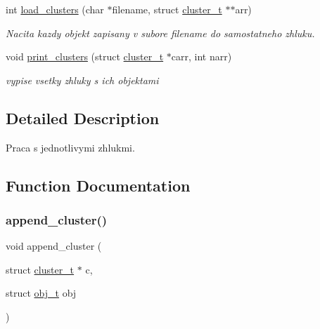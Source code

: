 \begin{DoxyCompactItemize}
int \hyperlink{group___praca_ga9d928923d43120cb53ddff210a087061}{load\+\_\+clusters} (char $\ast$filename, struct \hyperlink{structcluster__t}{cluster\+\_\+t} $\ast$$\ast$arr)
\begin{DoxyCompactList}\small\item\em Nacita kazdy objekt zapisany v subore filename do samostatneho zhluku. \end{DoxyCompactList}\item 
void \hyperlink{group___praca_gad350e6021e5fead00ff2eeec4d134525}{print\+\_\+clusters} (struct \hyperlink{structcluster__t}{cluster\+\_\+t} $\ast$carr, int narr)
\begin{DoxyCompactList}\small\item\em vypise vsetky zhluky s ich objektami \end{DoxyCompactList}\end{DoxyCompactItemize}


\subsection{Detailed Description}
Praca s jednotlivymi zhlukmi. 



\subsection{Function Documentation}
\hypertarget{group___praca_gab6269b64b2c7f4842a51c58b2d86a2e5}{}\label{group___praca_gab6269b64b2c7f4842a51c58b2d86a2e5} 
\subsubsection{\texorpdfstring{append\+\_\+cluster()}{append\_cluster()}}
{\footnotesize\ttfamily void append\+\_\+cluster (\begin{DoxyParamCaption}\item[{struct \hyperlink{structcluster__t}{cluster\+\_\+t} $\ast$}]{c,  }\item[{struct \hyperlink{structobj__t}{obj\+\_\+t}}]{obj }\end{DoxyParamCaption})}

